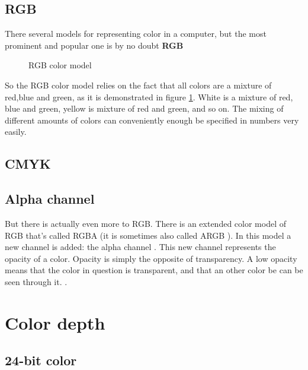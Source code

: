 \subsection{RGB}
\label{sec:rgb}

There several models for representing color in a computer, but the
most prominent and popular one is by no doubt \textbf{RGB} 

\begin{figure}[h]
  \centering
  
  \caption{RGB color model}
  \label{fig:rgb}
\end{figure}

So the RGB color model relies on the fact that all colors are a
mixture of red,blue and green, as it is demonstrated in figure
\ref{fig:rgb}. White is a mixture of red, blue and green, yellow is
mixture of red and green, and so on. The mixing of different amounts
of colors can conveniently enough be specified in numbers very
easily.

\subsection{CMYK}
\label{sec:cmyk}

\subsection{Alpha channel}
\label{sec:alpha_chan}


But there is actually even more to RGB. There is an extended color
model of RGB that's called RGBA (it is sometimes also
called ARGB ). In this model a new channel is added: the
alpha channel . This new channel represents the
opacity of a color. Opacity is simply the opposite of transparency.  A
low opacity means that the color in question is transparent,
 and that an other color be can be seen
through it.  \cite{porter84_compos_dig_img}.

\section{Color depth}
\label{sec:bit-depth}

\subsection{24-bit color}
\label{sec:24-bit-color}

